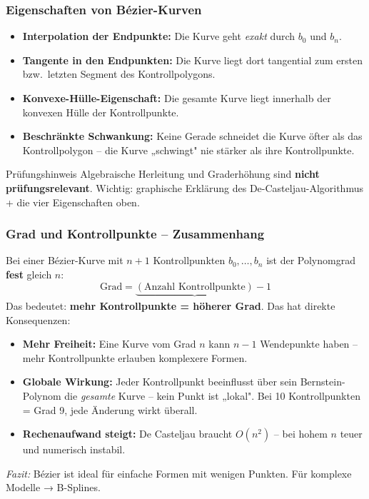 \documentclass[12pt, a4paper]{article}
\begin{document}
\subsubsection*{Eigenschaften von Bézier-Kurven}

\begin{itemize}
  \item \textbf{Interpolation der Endpunkte:} Die Kurve geht \textit{exakt} durch $b_0$ und $b_n$.
  \item \textbf{Tangente in den Endpunkten:} Die Kurve liegt dort tangential zum ersten bzw.\ letzten Segment des Kontrollpolygons.
  \item \textbf{Konvexe-Hülle-Eigenschaft:} Die gesamte Kurve liegt innerhalb der konvexen Hülle der Kontrollpunkte.
  \item \textbf{Beschränkte Schwankung:} Keine Gerade schneidet die Kurve öfter als das Kontrollpolygon -- die Kurve „schwingt" nie stärker als ihre Kontrollpunkte.
\end{itemize}

\begin{notebox}{Prüfungshinweis}
Algebraische Herleitung und Graderhöhung sind \textbf{nicht prüfungsrelevant}. Wichtig: graphische Erklärung des De-Casteljau-Algorithmus + die vier Eigenschaften oben.
\end{notebox}

\subsubsection*{Grad und Kontrollpunkte -- Zusammenhang}

Bei einer Bézier-Kurve mit $n+1$ Kontrollpunkten $b_0, \dots, b_n$ ist der Polynomgrad \textbf{fest} gleich $n$:
\[
  \text{Grad} = \underbrace{(\text{Anzahl Kontrollpunkte})}_{ } - 1
\]
Das bedeutet: \textbf{mehr Kontrollpunkte = höherer Grad}. Das hat direkte Konsequenzen:
\begin{itemize}
  \item \textbf{Mehr Freiheit:} Eine Kurve vom Grad $n$ kann $n-1$ Wendepunkte haben -- mehr Kontrollpunkte erlauben komplexere Formen.
  \item \textbf{Globale Wirkung:} Jeder Kontrollpunkt beeinflusst über sein Bernstein-Polynom die \textit{gesamte} Kurve -- kein Punkt ist „lokal". Bei 10 Kontrollpunkten = Grad 9, jede Änderung wirkt überall.
  \item \textbf{Rechenaufwand steigt:} De Casteljau braucht $O(n^2)$ -- bei hohem $n$ teuer und numerisch instabil.
\end{itemize}
\textit{Fazit:} Bézier ist ideal für einfache Formen mit wenigen Punkten. Für komplexe Modelle → B-Splines.
\end{document}
